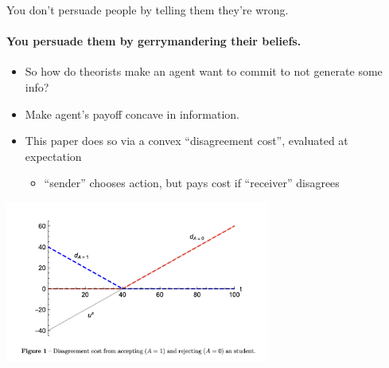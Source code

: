 \documentclass[11pt, aspectratio=169]{beamer}
\theoremstyle{plain}
\theoremstyle{plain}
\theoremstyle{plain}
\theoremstyle{plain}
\begin{document}
\begin{frame}{You don't persuade people by telling them they're wrong.}\framesubtitle{You persuade them by gerrymandering their beliefs.}
\begin{itemize}
    \pause 
    \item So how do theorists make an agent want to commit to not generate some info? \pause
    \item  Make agent's payoff concave in information. \pause
    \item This paper does so via a convex ``disagreement cost'', evaluated at expectation \pause
    \begin{itemize}
        \item``sender'' chooses action, but pays cost if ``receiver'' disagrees \pause
    \end{itemize}

\end{itemize}
\begin{center} \includegraphics[width=0.65\textwidth]{testoptional-fig1.png} \end{center}
\end{frame}






    
\end{document}
